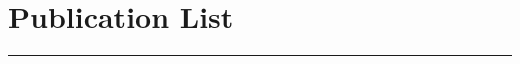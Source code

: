 \documentclass[10pt]{cv}
\begin{document}
\section{{\LARGE \bf{Publication List}}}
{\rule{\linewidth}{0.5mm}} \\
\begin{llist}



%
\end{llist}
\end{document}
